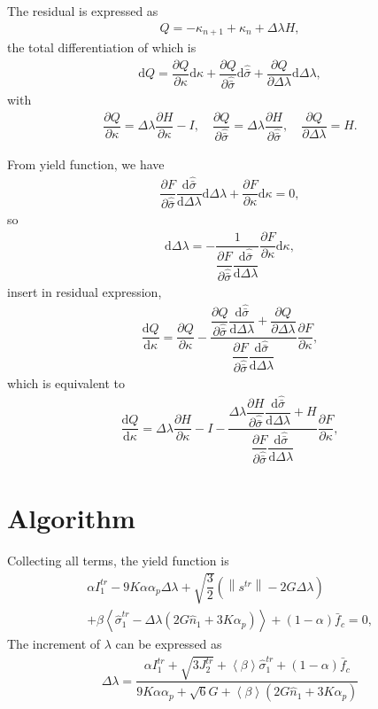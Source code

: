 \documentclass[5p]{elsarticle}
\newcommand*{\md}[1]{\mathrm{d}#1}
\newcommand*{\norm}[1]{\left\lVert#1\right\rVert}
\newcommand*{\pdfrac}[2]{\dfrac{\partial#1}{\partial#2}}
\newcommand*{\ddfrac}[2]{\dfrac{\md#1}{\md#2}}
\begin{document}
The residual is expressed as
\begin{gather*}
Q=-\kappa_{n+1}+\kappa_n+\Delta\lambda{}H,
\end{gather*}
the total differentiation of which is
\begin{gather*}
\md{Q}=\pdfrac{Q}{\kappa}\md{\kappa}+\pdfrac{Q}{\hat{\bar{\sigma}}}\md{\hat{\bar{\sigma}}}+\pdfrac{Q}{\Delta\lambda}\md{\Delta\lambda},
\end{gather*}
with
\begin{gather*}
\pdfrac{Q}{\kappa}=\Delta\lambda\pdfrac{H}{\kappa}-I,\quad
\pdfrac{Q}{\hat{\bar{\sigma}}}=\Delta\lambda\pdfrac{H}{\hat{\bar{\sigma}}},\quad
\pdfrac{Q}{\Delta\lambda}=H.
\end{gather*}

From yield function, we have
\begin{gather*}
\pdfrac{F}{\hat{\bar{\sigma}}}\ddfrac{\hat{\bar{\sigma}}}{\Delta\lambda}\md{\Delta\lambda}+\pdfrac{F}{\kappa}\md{\kappa}=0,
\end{gather*}
so
\begin{gather*}
\md{\Delta\lambda}=-\dfrac{1}{\pdfrac{F}{\hat{\bar{\sigma}}}\ddfrac{\hat{\bar{\sigma}}}{\Delta\lambda}}\pdfrac{F}{\kappa}\md{\kappa},
\end{gather*}
insert in residual expression,
\begin{gather*}
\ddfrac{Q}{\kappa}=\pdfrac{Q}{\kappa}-\dfrac{\pdfrac{Q}{\hat{\bar{\sigma}}}\ddfrac{\hat{\bar{\sigma}}}{\Delta\lambda}+\pdfrac{Q}{\Delta\lambda}}{\pdfrac{F}{\hat{\bar{\sigma}}}\ddfrac{\hat{\bar{\sigma}}}{\Delta\lambda}}\pdfrac{F}{\kappa},
\end{gather*}
which is equivalent to
\begin{gather}
\ddfrac{Q}{\kappa}=\Delta\lambda\pdfrac{H}{\kappa}-I-\dfrac{\Delta\lambda\pdfrac{H}{\hat{\bar{\sigma}}}\ddfrac{\hat{\bar{\sigma}}}{\Delta\lambda}+H}{\pdfrac{F}{\hat{\bar{\sigma}}}\ddfrac{\hat{\bar{\sigma}}}{\Delta\lambda}}\pdfrac{F}{\kappa},
\end{gather}
\section{Algorithm}
Collecting all terms, the yield function is
\begin{multline*}
\alpha{}I_1^{tr}-9K\alpha\alpha_p\Delta\lambda+\sqrt{\dfrac{3}{2}}\left(\norm{s^{tr}}-2G\Delta\lambda\right)\\+\beta\left<\hat{\sigma}^{tr}_1-\Delta\lambda\left(2G\hat{n}_1+3K\alpha_p\right)\right>+\left(1-\alpha\right)\bar{f}_c=0,
\end{multline*}
The increment of $\lambda$ can be expressed as
\begin{gather}
\Delta\lambda=\dfrac{\alpha{}I_1^{tr}+\sqrt{3J_2^{tr}}+\left<\beta\right>\hat{\sigma}^{tr}_1+\left(1-\alpha\right)\bar{f}_c}{9K\alpha\alpha_p+\sqrt{6}G+\left<\beta\right>\left(2G\hat{n}_1+3K\alpha_p\right)}
\end{gather}
\end{document}
